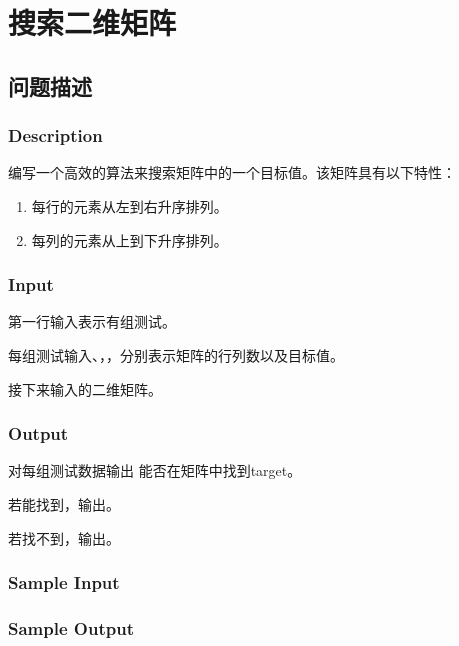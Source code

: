\section{搜索二维矩阵}
\subsection{问题描述}
\subsubsection*{Description}
编写一个高效的算法来搜索矩阵中的一个目标值。该矩阵具有以下特性：
\begin{enumerate}
	\item 每行的元素从左到右升序排列。
	\item 每列的元素从上到下升序排列。
\end{enumerate}

\subsubsection*{Input}

第一行输入表示有组测试。

每组测试输入、，，分别表示矩阵的行列数以及目标值。

接下来输入的二维矩阵。

\subsubsection*{Output}

对每组测试数据输出 能否在矩阵中找到target。

若能找到，输出。

若找不到，输出。

\subsubsection*{Sample Input}








\subsubsection*{Sample Output}

